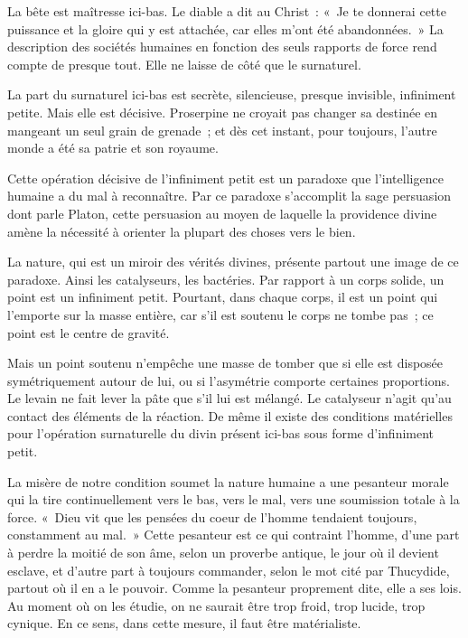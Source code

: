 \documentclass[french,twoside]{book} %
\begin{document}
La bête est maîtresse ici-bas. Le diable a dit au Christ : « Je te donnerai cette puissance et la gloire qui y est attachée, car elles m'ont été abandonnées. » La description des sociétés humaines en fonction des seuls rapports de force rend compte de presque tout. Elle ne laisse de côté que le surnaturel.\par
La part du surnaturel ici-bas est secrète, silencieuse, presque invisible, infiniment petite. Mais elle est décisive. Proserpine ne croyait pas changer sa destinée en mangeant un seul grain de grenade ; et dès cet instant, pour toujours, l'autre monde a été sa patrie et son royaume.\par
Cette opération décisive de l'infiniment petit est un paradoxe que l'intelligence humaine a du mal à reconnaître. Par ce paradoxe s'accomplit la sage persuasion dont parle Platon, cette persuasion au moyen de laquelle la providence divine amène la nécessité à orienter la plupart des choses vers le bien.\par
La nature, qui est un miroir des vérités divines, présente partout une image de ce paradoxe. Ainsi les catalyseurs, les bactéries. Par rapport à un corps solide, un point est un infiniment petit. Pourtant, dans chaque corps, il est un point qui l'emporte sur la masse entière, car s'il est soutenu le corps ne tombe pas ; ce point est le centre de gravité.\par
Mais un point soutenu n'empêche une masse de tomber que si elle est disposée symétriquement autour de lui, ou si l'asymétrie comporte certaines proportions. Le levain ne fait lever la pâte que s'il lui est mélangé. Le catalyseur n'agit qu'au contact des éléments de la réaction. De même il existe des conditions matérielles pour l'opération surnaturelle du divin présent ici-bas sous forme d'infiniment petit.\par
La misère de notre condition soumet la nature humaine a une pesanteur morale qui la tire continuellement vers le bas, vers le mal, vers une soumission totale à la force. « Dieu vit que les pensées du coeur de l'homme tendaient toujours, constamment au mal. » Cette pesanteur est ce qui contraint l'homme, d'une part à perdre la moitié de son âme, selon un proverbe antique, le jour où il devient esclave, et d'autre part à toujours commander, selon le mot cité par Thucydide, partout où il en a le pouvoir. Comme la pesanteur proprement dite, elle a ses lois. Au moment où on les étudie, on ne saurait être trop froid, trop lucide, trop cynique. En ce sens, dans cette mesure, il faut être matérialiste.\par
\end{document}
